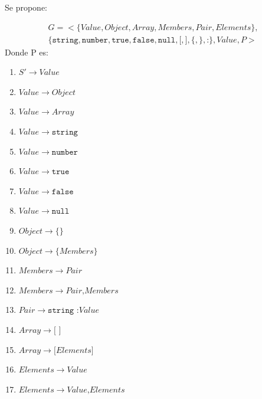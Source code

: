 \documentclass{article}
\begin{document}
Se propone:

\begin{align*}
G=< \{Value, Object, Array, Members, Pair, Elements\}, \\ \{\texttt{string}, \texttt{number}, \texttt{true}, \texttt{false}, \texttt{null}, \texttt{[}, \texttt{]}, \texttt{\{}, \texttt{\}}, \texttt{:} \}, Value, P>
\end{align*}
Donde P es:

\begin{multicols}{2}
	\begin{enumerate}[(1)]
		\item $S' \to Value$\hspace*{5mm}
		\item $Value \to Object$
		\item $Value \to Array$
		\item $Value \to \texttt{string}$
		\item $Value \to \texttt{number}$
		\item $Value \to \texttt{true}$
		\item $Value \to \texttt{false}$
		\item $Value \to \texttt{null}$
		\item $Object \to \texttt{\{ \}}$
		\item $Object \to \texttt{\{} Members \texttt{\}}$
		\item $Members \to Pair$
		\item $Members \to Pair \texttt{,} Members$
		\item $Pair \to \texttt{string :} Value$
		\item $Array \to \texttt{[ ]}$
		\item $Array \to \texttt{[} Elements \texttt{]}$
		\item $Elements \to Value$
		\item $Elements \to Value \texttt{,} Elements$
	\end{enumerate}
\end{multicols}
\end{document}
